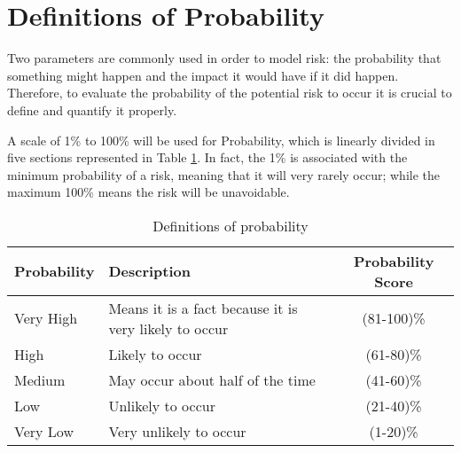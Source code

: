 \section{Definitions of Probability}
\label{3.1}
Two parameters are commonly used in order to model risk: the probability that something might happen and the impact it would have if it did happen. Therefore, to evaluate the probability of the potential risk to occur it is crucial to define and quantify it properly. 

A scale of 1\% to 100\% will be used for Probability, which is linearly divided in five sections represented in Table \ref{definitionsofprobability}. In fact, the 1\% is associated with the minimum probability of a risk, meaning that it will very rarely occur; while the maximum 100\% means the risk will be unavoidable.

\begin{table}[H]
	\centering
	\begin{tabular}{l >{\raggedright\arraybackslash}p{7.8cm} c}
		
		\toprule[2pt]
		
		\textbf{Probability} &  \textbf{Description}  & \textbf{Probability Score}\\
		
		\midrule [1.5pt]
		
		Very High & Means it is a fact because it is very likely to occur & (81-100)\% \vspace{0.2cm} \\
		
		\midrule
		
		High & Likely to occur & (61-80)\% \vspace{0.2cm} \\
		
		\midrule
		
		Medium & May occur about half of the time & (41-60)\% \vspace{0.2cm} \\
	
		\midrule
	
		Low & Unlikely to occur & (21-40)\% \vspace{0.2cm} \\
	
		\midrule
	
		Very Low & Very unlikely to occur & (1-20)\% \vspace{0.2cm} \\
			
		\bottomrule[2pt]

	\end{tabular}
	\caption{Definitions of probability}
	\label{definitionsofprobability}
\end{table}